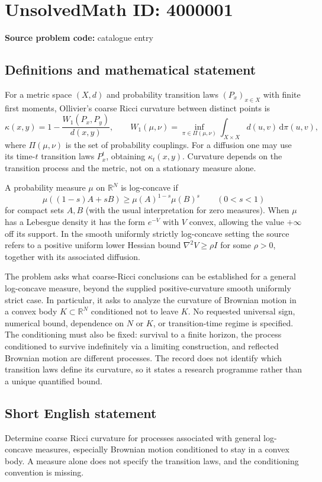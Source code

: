 \documentclass[11pt]{article}
\newcommand{\R}{\mathbb{R}}
\begin{document}
\section*{UnsolvedMath ID: 4000001}
\textbf{Source problem code:} catalogue entry
\subsection{Definitions and mathematical statement}
For a metric space $(X,d)$ and probability transition laws $(P_x)_{x\in X}$ with finite first moments, Ollivier's coarse Ricci curvature between distinct points is
\[
\kappa(x,y)=1-\frac{W_1(P_x,P_y)}{d(x,y)},\qquad
W_1(\mu,\nu)=\inf_{\pi\in\Pi(\mu,\nu)}\int_{X\times X}d(u,v)\,\mathrm{d}\pi(u,v),
\]
where $\Pi(\mu,\nu)$ is the set of probability couplings. For a diffusion one may use its time-$t$ transition laws $P_x^t$, obtaining $\kappa_t(x,y)$. Curvature depends on the transition process and the metric, not on a stationary measure alone.

A probability measure $\mu$ on $\R^N$ is log-concave if
\[
\mu((1-s)A+sB)\geq\mu(A)^{1-s}\mu(B)^s\qquad(0<s<1)
\]
for compact sets $A,B$ (with the usual interpretation for zero measures). When $\mu$ has a Lebesgue density it has the form $e^{-V}$ with $V$ convex, allowing the value $+\infty$ off its support. In the smooth uniformly strictly log-concave setting the source refers to a positive uniform lower Hessian bound $\nabla^2V\geq\rho I$ for some $\rho>0$, together with its associated diffusion.

The problem asks what coarse-Ricci conclusions can be established for a general log-concave measure, beyond the supplied positive-curvature smooth uniformly strict case. In particular, it asks to analyze the curvature of Brownian motion in a convex body $K\subset\R^N$ conditioned not to leave $K$. No requested universal sign, numerical bound, dependence on $N$ or $K$, or transition-time regime is specified. The conditioning must also be fixed: survival to a finite horizon, the process conditioned to survive indefinitely via a limiting construction, and reflected Brownian motion are different processes. The record does not identify which transition laws define its curvature, so it states a research programme rather than a unique quantified bound.
\subsection{Short English statement}
Determine coarse Ricci curvature for processes associated with general log-concave measures, especially Brownian motion conditioned to stay in a convex body. A measure alone does not specify the transition laws, and the conditioning convention is missing.
\end{document}
